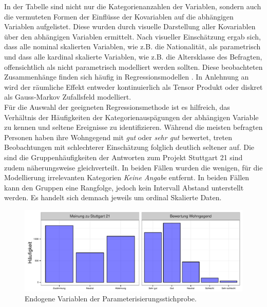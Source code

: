 \documentclass{Vorlage}
\begin{document}
In der Tabelle sind nicht nur die Kategorienanzahlen der Variablen, sondern auch die vermuteten Formen der Einflüsse der Kovariablen auf die abhängigen Variablen aufgelistet. Diese wurden durch visuelle Darstellung aller Kovariablen über den abhängigen Variablen ermittelt. Nach visueller Einschätzung ergab sich, dass alle nominal skalierten Variablen, wie z.B. die Nationalität, als parametrisch und dass alle kardinal skalierte Variablen, wie z.B. die Altersklasse des Befragten, offensichtlich als nicht parametrisch modelliert werden sollten. Diese beobachteten Zusammenhänge finden sich häufig in Regressionsmodellen \cite[p. 9]{fahrmeir2009regression}. In Anlehnung an \cite[p. 503 ff., p. 524 ff.]{fahrmeir2013regression} wird der räumliche Effekt entweder kontinuierlich als Tensor Produkt oder diskret als Gauss-Markov Zufallsfeld modelliert.\\
Für die Auswahl der geeigneten Regressionsmethode ist es hilfreich, das Verhältnis der Häufigkeiten der Kategorienauspägungen der abhängigen Variable zu kennen und seltene Ereignisse zu identifizieren. Während die meisten befragten Personen haben ihre Wohngegend mit \textit{gut} oder \textit{sehr gut} bewertet, treten Beobachtungen mit schlechterer Einschätzung folglich deutlich seltener auf. Die sind die Gruppenhäufigkeiten der Antworten zum Projekt Stuttgart 21 sind zudem näherungsweise gleichverteilt. In beiden Fällen wurden die wenigen, für die Modellierung irrelevanten Kategorien \textit{Keine Angabe} entfernt. In beiden Fällen kann den Gruppen eine Rangfolge, jedoch kein Intervall Abstand unterstellt werden. Es handelt sich demnach jeweils um ordinal Skalierte Daten.

\begin{figure}[h]
 \begin{center}
 \includegraphics[scale=0.8]{Pictures/BarResp}
 \caption{Endogene Variablen der Parameterisierungsstichprobe.}
 \label{endogene}
 \end{center}
\end{figure}
\end{document}
